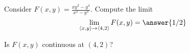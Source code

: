 \documentclass{ximera}
\author{Jim Talamo \and Bart Snapp}
\begin{document}
\begin{exercise}
  Consider $F(x,y) = \frac{xy^2-y^4}{x^2-y^4}$.  Compute the limit
  \[
  \lim_{\vector{x,y}\to \vector{4,2}} F(x,y) = \answer{1/2}
  \]
  \begin{exercise}
  Is $F(x,y)$ continuous at $(4,2)$?
  \begin{multipleChoice}
  \end{multipleChoice}
  \end{exercise}
\end{exercise}
\end{document}
